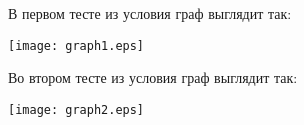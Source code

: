 В первом тесте из условия граф выглядит так:


\begin{center}
\texttt{[image: graph1.eps]}
\end{center}


Во втором тесте из условия граф выглядит так:

\begin{center}
\texttt{[image: graph2.eps]}
\end{center}
